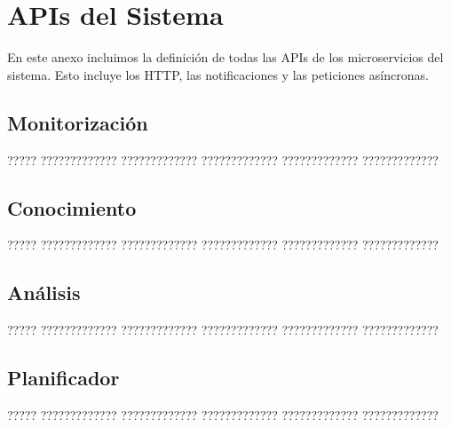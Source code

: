 \chapter{APIs del Sistema}
\label{anx:apis}

En este anexo incluimos la definición de todas las APIs de los microservicios del sistema. Esto incluye los  HTTP, las notificaciones y las peticiones asíncronas.

\section{Monitorización}

????? ????????????? ????????????? ????????????? ????????????? ?????????????

\section{Conocimiento}

????? ????????????? ????????????? ????????????? ????????????? ?????????????

\section{Análisis}

????? ????????????? ????????????? ????????????? ????????????? ?????????????

\section{Planificador}

????? ????????????? ????????????? ????????????? ????????????? ?????????????
